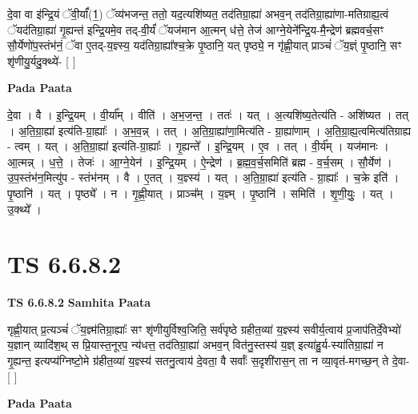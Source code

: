 \documentclass[17pt]{extarticle}
\begin{document}
दे॒वा वा इ॑न्द्रि॒यं ॅवी॒र्यां᳚(1॒) ॅव्य॑भजन्त॒ ततो॒ यद॒त्यशि॑ष्यत॒ तद॑तिग्रा॒ह्या॑ अभव॒न् तद॑तिग्रा॒ह्या॑णा-मतिग्राह्य॒त्वं ॅयद॑तिग्रा॒ह्या॑ गृ॒ह्यन्त॑ इन्द्रि॒यमे॒व तद्-वी॒र्यं॑ ॅयज॑मान आ॒त्मन् ध॑त्ते॒ तेज॑ आग्ने॒येने᳚न्द्रि॒य-मै॒न्द्रेण॑ ब्रह्मवर्च॒सꣳ सौ॒र्येणो॑प॒स्तंभ॑नं॒ ॅवा ए॒तद्-य॒ज्ञ्स्य॒ यद॑तिग्रा॒ह्या᳚श्च॒क्रे पृ॒ष्ठानि॒ यत् पृष्ठ्ये॒ न गृ॑ह्णी॒यात् प्राञ्चं॑ ॅय॒ज्ञ्ं पृ॒ष्ठानि॒ सꣳ शृ॑णीयु॒र्यदु॒क्थ्ये॑- [  ] \newline

\textbf{Pada Paata} \newline

दे॒वा । वै । इ॒न्द्रि॒यम् । वी॒र्या᳚म् । वीति॑ । अ॒भ॒ज॒न्त॒ । ततः॑ । यत् । अ॒त्यशि॑ष्य॒तेत्य॑ति - अशि॑ष्यत । तत् । अ॒ति॒ग्रा॒ह्या॑ इत्य॑ति-ग्रा॒ह्याः᳚ । अ॒भ॒व॒न्न् । तत् । अ॒ति॒ग्रा॒ह्या॑णा॒मित्य॑ति - ग्रा॒ह्या॑णाम् । अ॒ति॒ग्रा॒ह्य॒त्वमित्य॑तिग्राह्य - त्वम् । यत् । अ॒ति॒ग्रा॒ह्या॑ इत्य॑ति-ग्रा॒ह्याः᳚ । गृ॒ह्यन्ते᳚ । इ॒न्द्रि॒यम् । ए॒व । तत् । वी॒र्य᳚म् । यज॑मानः । आ॒त्मन्न् । ध॒त्ते॒ । तेजः॑ । आ॒ग्ने॒येन॑ । इ॒न्द्रि॒यम् । ऐ॒न्द्रेण॑ । ब्र॒ह्म॒व॒र्च॒समिति॑ ब्रह्म - व॒र्च॒सम् । सौ॒र्येण॑ । उ॒प॒स्तंभ॑न॒मित्यु॑प - स्तंभ॑नम् । वै । ए॒तत् । य॒ज्ञ्स्य॑ । यत् । अ॒ति॒ग्रा॒ह्या॑ इत्य॑ति - ग्रा॒ह्याः᳚ । च॒क्रे इति॑ । पृ॒ष्ठानि॑ । यत् । पृष्ठ्ये᳚ । न । गृ॒ह्णी॒यात् । प्राञ्च᳚म् । य॒ज्ञ्म् । पृ॒ष्ठानि॑ । समिति॑ । शृ॒णी॒युः॒ । यत् । उ॒क्थ्ये᳚ ।  \newline




\section*{ TS 6.6.8.2 }

\textbf{TS 6.6.8.2 } \newline
\textbf{Samhita Paata} \newline

गृह्णी॒यात् प्र॒त्यञ्चं॑ ॅय॒ज्ञ्म॑तिग्रा॒ह्याः᳚ सꣳ शृ॑णीयुर्विश्व॒जिति॒ सर्व॑पृष्ठे ग्रहीत॒व्या॑ य॒ज्ञ्स्य॑ सवीर्य॒त्वाय॑ प्र॒जाप॑तिर्दे॒वेभ्यो॑ य॒ज्ञान् व्यादि॑श॒थ् स प्रि॒यास्त॒नूरप॒ न्य॑धत्त॒ तद॑तिग्रा॒ह्या॑ अभव॒न् वित॑नु॒स्तस्य॑ य॒ज्ञ् इत्या॑हु॒र्य-स्या॑तिग्रा॒ह्या॑ न गृ॒ह्यन्त॒ इत्यप्य॑ग्निष्टो॒मे ग्र॑हीत॒व्या॑ य॒ज्ञ्स्य॑ सतनु॒त्वाय॑ दे॒वता॒ वै सर्वाः᳚ स॒दृशी॑रास॒न् ता न व्या॒वृत॑-मगच्छ॒न् ते दे॒वा- [  ] \newline

\textbf{Pada Paata} \newline
\end{document}

